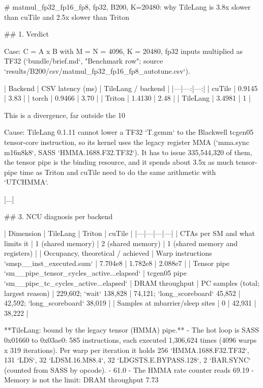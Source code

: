 \begin{promptbox}
# matmul_fp32_fp16_fp8, fp32, B200, K=20480: why TileLang is 3.8x slower than cuTile and 2.5x slower than Triton

## 1. Verdict

Case: C = A x B with M = N = 4096, K = 20480, fp32 inputs multiplied as TF32 (`bundle/brief.md`, "Benchmark row"; source `results/B200/csv/matmul_fp32_fp16_fp8_autotune.csv`).

| Backend | CSV latency (ms) | TileLang / backend |
|---|---:|---:|
| cuTile | 0.9145 | 3.83 |
| torch | 0.9466 | 3.70 |
| Triton | 1.4130 | 2.48 |
| TileLang | 3.4981 | 1 |

This is a divergence, far outside the 10%

Cause: TileLang 0.1.11 cannot lower a TF32 `T.gemm` to the Blackwell tcgen05 tensor-core instruction, so its kernel uses the legacy register MMA (`mma.sync m16n8k8`, SASS `HMMA.1688.F32.TF32`). It has to issue 335,544,320 of them, the tensor pipe is the binding resource, and it spends about 3.5x as much tensor-pipe time as Triton and cuTile need to do the same arithmetic with `UTCHMMA`.

[...]

## 3. NCU diagnosis per backend

| Dimension | TileLang | Triton | cuTile |
|---|---|---|---|
| CTAs per SM and what limits it | 1 (shared memory) | 2 (shared memory) | 1 (shared memory and registers) |
| Occupancy, theoretical / achieved %
| Warp instructions `smsp__inst_executed.sum` | 7.704e8 | 1.782e8 | 2.088e7 |
| Tensor pipe `sm__pipe_tensor_cycles_active...elapsed` %
| tcgen05 pipe `sm__pipe_tc_cycles_active...elapsed` %
| DRAM throughput %
| PC samples (total; largest reason) | 229,602; `wait` 138,828 | 74,121; `long_scoreboard` 45,852 | 42,592; `long_scoreboard` 38,019 |
| Samples at mbarrier/sleep sites | 0 | 42,931 | 38,222 |

**TileLang: bound by the legacy tensor (HMMA) pipe.**
- The hot loop is SASS 0x01660 to 0x03ae0: 585 instructions, each executed 1,306,624 times (4096 warps x 319 iterations). Per warp per iteration it holds 256 `HMMA.1688.F32.TF32`, 131 `LDS`, 32 `LDSM.16.M88.4`, 32 `LDGSTS.E.BYPASS.128`, 2 `BAR.SYNC` (counted from SASS by opcode).
- 61.0%
- The HMMA rate counter reads 69.19%
- Memory is not the limit: DRAM throughput 7.73%


\end{promptbox}
